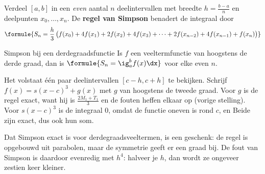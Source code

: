 \begin{theorie}
Verdeel $[a, b]$ in een \textit{even} aantal $n$ deelintervallen met breedte $h = \frac{b - a}{n}$ en deelpunten $x_0, \ldots, x_n$. De \textbf{\textcolor{accent}{regel van Simpson}} benadert de integraal door
\[
\formule{S_n = \frac h3\,\bigl(f(x_0) + 4f(x_1) + 2f(x_2) + 4f(x_3) + \cdots + 2f(x_{n-2}) + 4f(x_{n-1}) + f(x_n)\bigr)}
\]
\begin{stelling}{Simpson bij een derdegraadsfunctie}
Is $f$ een veeltermfunctie van hoogstens de derde graad, dan is $\formule{S_n = \ig_a^b f(x)\dx}$ voor elke even $n$.
\end{stelling}

\begin{bewijs}
Het volstaat één paar deelintervallen $[c - h, c + h]$ te bekijken. Schrijf $f(x) = s(x - c)^3 + g(x)$ met $g$ van hoogstens de tweede graad. Voor $g$ is de regel exact, want hij is $\frac{2M_1 + T_1}{3}$ en de fouten heffen elkaar op (vorige stelling). Voor $s(x - c)^3$ is de integraal 0, omdat de functie oneven is rond $c$, en
Beide zijn exact, dus ook hun som.
\end{bewijs}
\end{theorie}

Dat Simpson exact is voor derdegraadsveeltermen, is een geschenk: de regel is opgebouwd uit parabolen, maar de symmetrie geeft er een graad bij. De fout van Simpson is daardoor evenredig met $h^4$: halveer je $h$, dan wordt ze ongeveer zestien keer kleiner.


